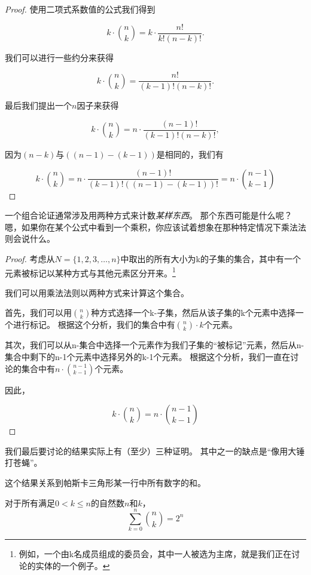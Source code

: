 \begin{proof}

使用二项式系数值的公式我们得到

\[ k \cdot \binom{n}{k} = k \cdot \frac{n!}{k! (n-k)!}. \]

我们可以进行一些约分来获得

\[ k \cdot \binom{n}{k} = \frac{n!}{(k-1)! (n-k)!}. \]

最后我们提出一个$n$因子来获得

\[ k \cdot \binom{n}{k} = n \cdot \frac{(n-1)!}{(k-1)! (n-k)!}, \]

\noindent 因为$(n-k)$与$((n-1)-(k-1))$是相同的，我们有

\[ k \cdot \binom{n}{k} = n \cdot \frac{(n-1)!}{(k-1)!((n-1)-(k-1))!} 
= n \cdot \binom{n-1}{k-1} \]

\end{proof}

一个组合论证通常涉及用两种方式来计数\emph{某样东西}。
那个东西可能是什么呢？嗯，如果你在某个公式中看到一个乘积，你应该试着想象在那种特定情况下乘法法则会说什么。

\begin{proof} 
考虑从$N = \{1, 2, 3, \ldots, n\}$中取出的所有大小为k的子集的集合，其中有一个元素被标记以某种方式与其他元素区分开来。\footnote{例如，一个由k名成员组成的委员会，其中一人被选为主席，就是我们正在讨论的实体的一个例子。}

我们可以用乘法法则以两种方式来计算这个集合。

首先，我们可以用$\binom{n}{k}$种方式选择一个k-子集，然后从该子集的k个元素中选择一个进行标记。
根据这个分析，我们的集合中有$\binom{n}{k} \cdot k$个元素。

其次，我们可以从n-集合中选择一个元素作为我们子集的“被标记”元素，然后从n-集合中剩下的n-1个元素中选择另外的k-1个元素。
根据这个分析，我们一直在讨论的集合中有$n \cdot \binom{n-1}{k-1}$个元素。

因此，

\[ k \cdot \binom{n}{k} = n \cdot \binom{n-1}{k-1} \]

\end{proof}

我们最后要讨论的结果实际上有（至少）三种证明。
其中之一的缺点是“像用大锤打苍蝇”。

这个结果关系到帕斯卡三角形某一行中所有数字的和。

\begin{thm}
对于所有满足$0 < k \leq n$的自然数$n$和$k$，
\[ \sum_{k=0}^n \binom{n}{k} = 2^n \]
\end{thm}

